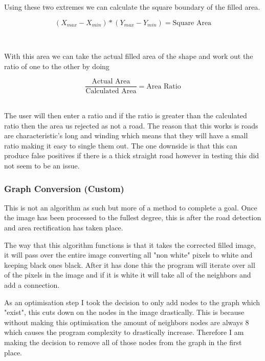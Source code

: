 \begin{FlushLeft}
    Using these two extremes we can calculate the square boundary of the filled area.

    $$
        (X_{max} - X_{min}) * (Y_{max} - Y_{min}) = \text{Square Area} 
    $$

    \\ \bk

    With this area we can take the actual filled area of the shape and work out the ratio of one to the other by doing

    $$
        \frac{\text{Actual Area}}{\text{Calculated Area}} = \text{Area Ratio}
    $$
    \\ \bk

    The user will then enter a ratio and if the ratio is greater than the calculated ratio then the area us rejected as not a road. The reason that this works is roads are characteristic's long and winding which means that they will have a small ratio making it easy to single them out. The one downside is that this can produce false positives if there is a thick straight road however in testing this did not seem to be an issue. \\


    \bk

    \subsubsection{Graph Conversion (Custom)}
    This is not an algorithm as such but more of a method to complete a goal. Once the image has been processed to the fullest degree, this is after the road detection and area rectification has taken place.  \\ \bk

    The way that this algorithm functions is that it takes the corrected filled image, it will pass over the entire image converting all "non white" pixels to white and keeping black ones black. After it has done this the program will iterate over all of the pixels in the image and if it is white it will take all of the neighbors and add a connection. \\ \bk

    As an optimisation step I took the decision to only add nodes to the graph which "exist", this cuts down on the nodes in the image drastically. This is because without making this optimisation the amount of neighbors nodes are always 8 which causes the program complexity to drastically increase. Therefore I am making the decision to remove all of those nodes from the graph in the first place. \\ \bk


\end{FlushLeft}
